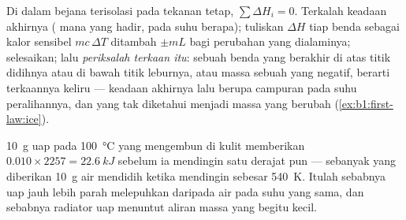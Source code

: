 \begin{method}\label{meth:b1:phase-changes:calorimetry}
Di dalam bejana terisolasi pada tekanan tetap, $\sum\Delta H_i = 0$. Terkalah
keadaan akhirnya ( mana yang hadir, pada suhu berapa);
tuliskan $\Delta H$ tiap benda sebagai kalor sensibel $mc\,\Delta T$ ditambah  $\pm mL$ bagi perubahan yang dialaminya; selesaikan; lalu \emph{periksalah terkaan itu}:
sebuah benda yang berakhir di atas titik didihnya atau di bawah titik
leburnya, atau massa sebuah  yang negatif, berarti terkaannya keliru --- keadaan
akhirnya lalu berupa campuran pada suhu peralihannya, dan yang
tak diketahui menjadi massa yang berubah (\cref{ex:b1:first-law:ice}).
\end{method}

\begin{example}\label{ex:b1:phase-changes:steam}
\qty{10}{g} uap pada \qty{100}{\degreeCelsius} yang mengembun di kulit memberikan
$0.010 \times 2257 = \qty{22.6}{kJ}$ sebelum ia mendingin satu derajat pun ---
sebanyak yang diberikan \qty{10}{g} air mendidih ketika mendingin sebesar
\qty{540}{K}. Itulah sebabnya uap jauh lebih parah melepuhkan daripada air pada
suhu yang sama, dan sebabnya radiator uap menuntut aliran massa yang begitu kecil.
\end{example}

